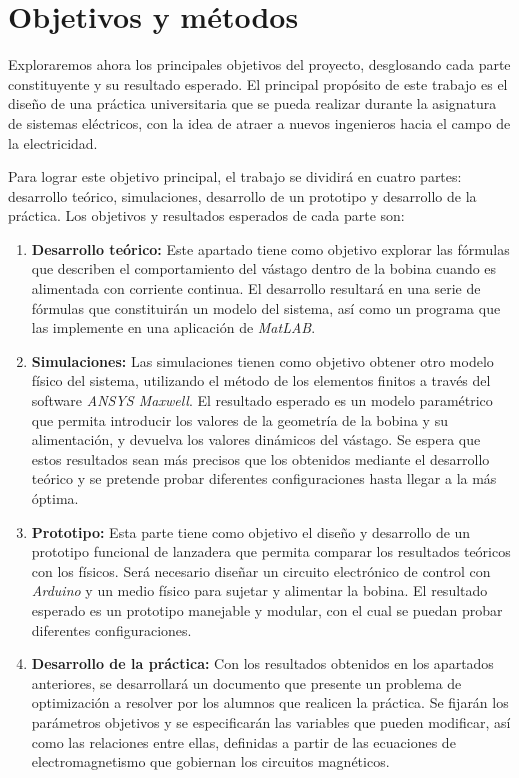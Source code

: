 \section{Objetivos y métodos}
\label{sec:motivacionyobjetivos}

Exploraremos ahora los principales objetivos del proyecto, desglosando cada parte constituyente y su resultado esperado. El principal propósito de este trabajo es el diseño de una práctica universitaria que se pueda realizar durante la asignatura de sistemas eléctricos, con la idea de atraer a nuevos ingenieros hacia el campo de la electricidad.

Para lograr este objetivo principal, el trabajo se dividirá en cuatro partes: desarrollo teórico, simulaciones, desarrollo de un prototipo y desarrollo de la práctica. Los objetivos y resultados esperados de cada parte son:

\begin{enumerate}
    \item \textbf{Desarrollo teórico:} Este apartado tiene como objetivo explorar las fórmulas que describen el comportamiento del vástago dentro de la bobina cuando es alimentada con corriente continua. El desarrollo resultará en una serie de fórmulas que constituirán un modelo del sistema, así como un programa que las implemente en una aplicación de \textit{MatLAB\textregistered}.
    \item \textbf{Simulaciones:} Las simulaciones tienen como objetivo obtener otro modelo físico del sistema, utilizando el método de los elementos finitos a través del software \textit{ANSYS Maxwell\textregistered}. El resultado esperado es un modelo paramétrico que permita introducir los valores de la geometría de la bobina y su alimentación, y devuelva los valores dinámicos del vástago. Se espera que estos resultados sean más precisos que los obtenidos mediante el desarrollo teórico y se pretende probar diferentes configuraciones hasta llegar a la más óptima.
    \item \textbf{Prototipo:} Esta parte tiene como objetivo el diseño y desarrollo de un prototipo funcional de lanzadera que permita comparar los resultados teóricos con los físicos. Será necesario diseñar un circuito electrónico de control con \textit{Arduino\textregistered} y un medio físico para sujetar y alimentar la bobina. El resultado esperado es un prototipo manejable y modular, con el cual se puedan probar diferentes configuraciones.
    \item \textbf{Desarrollo de la práctica:} Con los resultados obtenidos en los apartados anteriores, se desarrollará un documento que presente un problema de optimización a resolver por los alumnos que realicen la práctica. Se fijarán los parámetros objetivos y se especificarán las variables que pueden modificar, así como las relaciones entre ellas, definidas a partir de las ecuaciones de electromagnetismo que gobiernan los circuitos magnéticos.
\end{enumerate}

